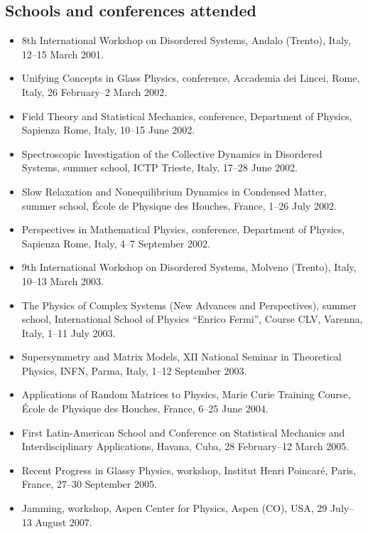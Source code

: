 \documentclass[a4paper,10pt]{article}
\begin{document}
\subsection{Schools and conferences attended}
\vspace{2pt}
{\small
\begin{itemize}[leftmargin=12pt,itemsep=1pt,topsep=2pt]
\item 8th International Workshop on Disordered Systems, Andalo (Trento), Italy, 12--15 March 2001.
\item Unifying Concepts in Glass Physics, conference, Accademia dei Lincei, Rome, Italy, 26 February--2 March 2002.
\item Field Theory and Statistical Mechanics, conference, Department of Physics, Sapienza Rome, Italy, 10--15 June 2002.
\item Spectroscopic Investigation of the Collective Dynamics in Disordered Systems, summer school, ICTP Trieste, Italy, 17--28 June 2002.
\item Slow Relaxation and Nonequilibrium Dynamics in Condensed Matter, summer school, \'Ecole de Physique des Houches, France, 1--26 July 2002.
\item Perspectives in Mathematical Physics, conference, Department of Physics, Sapienza Rome, Italy, 4--7 September 2002.
\item 9th International Workshop on Disordered Systems, Molveno (Trento), Italy, 10--13 March 2003.
\item The Physics of Complex Systems (New Advances and Perspectives), summer school, International School of Physics ``Enrico Fermi'', Course CLV, Varenna, Italy, 1--11 July 2003.
\item Supersymmetry and Matrix Models, XII National Seminar in Theoretical Physics, INFN, Parma, Italy, 1--12 September 2003.
\item Applications of Random Matrices to Physics, Marie Curie Training Course, \'Ecole de Physique des Houches, France, 6--25 June 2004.
\item First Latin-American School and Conference on Statistical Mechanics and Interdisciplinary Applications, Havana, Cuba, 28 February--12 March 2005.
\item Recent Progress in Glassy Physics, workshop, Institut Henri Poincar\'e, Paris, France, 27--30 September 2005.
\item Jamming, workshop, Aspen Center for Physics, Aspen (CO), USA, 29 July--13 August 2007.
\end{itemize}}
\end{document}
